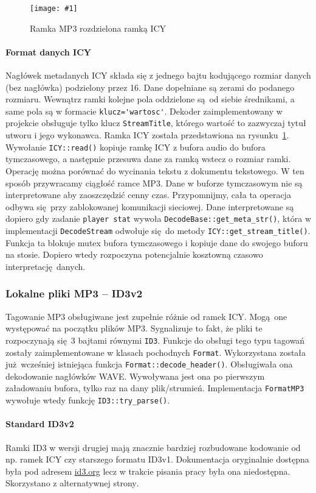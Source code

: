\documentclass[12pt]{report}
\newcommand{\imgint}[4]{
	\begin{figure}[{#4}]
		\centering
		\texttt{[image: \#1]}
		\caption{#2}
		\label{#1}
	\end{figure}
}
\newcommand{\imgcs}[3]{\imgint{#1}{#2}{#3}{}}
\begin{document}
			\imgcs{3/PicoRadio-icy}{Ramka MP3 rozdzielona ramką ICY}{0.9}
			\paragraph{Format danych ICY}
				Nagłówek metadanych ICY składa się z jednego bajtu kodującego rozmiar danych (bez nagłówka) podzielony przez 16. Dane dopełniane są zerami do podanego rozmiaru. Wewnątrz ramki kolejne pola oddzielone są od siebie średnikami, a same pola są w formacie \lstinline|klucz='wartosc'|. Dekoder zaimplementowany w projekcie obsługuje tylko klucz \lstinline|StreamTitle|, którego wartość to zazwyczaj tytuł utworu i jego wykonawca. Ramka ICY została przedstawiona na rysunku~\ref{3/PicoRadio-icy}.
				$ $\\
				
			Wywołanie \lstinline|ICY::read()| kopiuje ramkę ICY z bufora audio do bufora tymczasowego, a następnie przesuwa dane za ramką wstecz o rozmiar ramki. Operację można porównać do wycinania tekstu z dokumentu tekstowego. W ten sposób przywracamy ciągłość ramce MP3. Dane w buforze tymczasowym nie są interpretowane aby zaoszczędzić cenny czas. Przypomnijmy, cała ta operacja odbywa się przy zablokowanej komunikacji sieciowej. Dane interpretowane są dopiero gdy zadanie \lstinline|player stat| wywoła \lstinline|DecodeBase::get_meta_str()|, która w implementacji \lstinline|DecodeStream| odwołuje się do metody \lstinline|ICY::get_stream_title()|. Funkcja ta blokuje mutex bufora tymczasowego i kopiuje dane do swojego buforu na stosie. Dopiero wtedy rozpoczyna potencjalnie kosztowną czasowo interpretację danych.
		
		\subsubsection{Lokalne pliki MP3 -- ID3v2}
			Tagowanie MP3 obsługiwane jest zupełnie różnie od ramek ICY. Mogą one występować na początku plików MP3. Sygnalizuje to fakt, że pliki te rozpoczynają się 3 bajtami równymi \lstinline|ID3|. Funkcje do obsługi tego typu tagowań zostały zaimplementowane w klasach pochodnych \lstinline|Format|. Wykorzystana została już wcześniej istniejąca funkcja \lstinline|Format::decode_header()|. Obsługiwała ona dekodowanie nagłówków WAVE. Wywoływana jest ona po pierwszym załadowaniu bufora, tylko raz na dany plik/strumień. Implementacja \lstinline|FormatMP3| wywołuje wtedy funkcję \lstinline|ID3::try_parse()|.
			
			\paragraph{Standard ID3v2}
			Ramki ID3 w wersji drugiej mają znacznie bardziej rozbudowane kodowanie od np. ramek ICY czy starszego formatu ID3v1. Dokumentacja oryginalnie dostępna była pod adresem \href{id3.org}{id3.org} lecz w trakcie pisania pracy była ona niedostępna. Skorzystano z alternatywnej strony\textsuperscript{\cite{id3_spec_mutagen}}.
			
\end{document}
